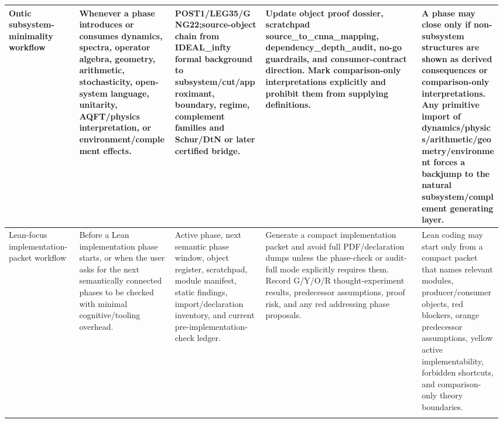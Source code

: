 \begin{longtable}{L{0.14\linewidth} L{0.19\linewidth} L{0.18\linewidth} L{0.31\linewidth} L{0.16\linewidth}}
\hline
\addlinespace[0.24em]
Ontic subsystem-minimality workflow & Whenever a phase introduces or consumes dynamics, spectra, operator algebra, geometry, arithmetic, stochasticity, open-system language, unitarity, AQFT/\allowbreak{}physics interpretation, or environment/\allowbreak{}complement effects. & POST1/\allowbreak{}LEG35/\allowbreak{}GNG22;\newline source-object chain from IDEAL\_infty formal background to subsystem/\allowbreak{}cut/\allowbreak{}approximant, boundary, regime, complement families and Schur/\allowbreak{}DtN or later certified bridge. & Update object proof dossier, scratchpad source\_to\_cnna\_mapping, dependency\_depth\_audit, no-go guardrails, and consumer-contract direction. Mark comparison-only interpretations explicitly and prohibit them from supplying definitions. & A phase may close only if non-subsystem structures are shown as derived consequences or comparison-only interpretations. Any primitive import of dynamics/\allowbreak{}physics/\allowbreak{}arithmetic/\allowbreak{}geometry/\allowbreak{}environment forces a backjump to the natural subsystem/\allowbreak{}complement generating layer.\\
\hline
\addlinespace[0.24em]
Lean-focus implementation-packet workflow & Before a Lean implementation phase starts, or when the user asks for the next semantically connected phases to be checked with minimal cognitive/\allowbreak{}tooling overhead. & Active phase, next semantic phase window, object register, scratchpad, module manifest, static findings, import/\allowbreak{}declaration inventory, and current pre-implementation-check ledger. & Generate a compact implementation packet and avoid full PDF/\allowbreak{}declaration dumps unless the phase-check or audit-full mode explicitly requires them. Record G/\allowbreak{}Y/\allowbreak{}O/\allowbreak{}R thought-experiment results, predecessor assumptions, proof risk, and any red addressing phase proposals. & Lean coding may start only from a compact packet that names relevant modules, producer/\allowbreak{}consumer objects, red blockers, orange predecessor assumptions, yellow active implementability, forbidden shortcuts, and comparison-only theory boundaries.\\
\hline
\addlinespace[0.24em]

\end{longtable}
